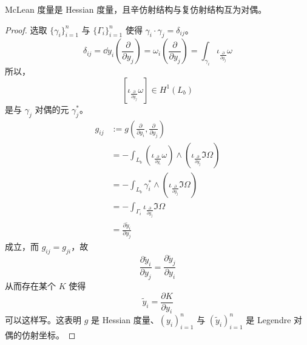 \begin{theorem}
McLean 度量是 Hessian 度量，且辛仿射结构与复仿射结构互为对偶。
\end{theorem}

\begin{proof}
选取 $\{\gamma_i\}_{i=1}^{n}$ 与 $\{\Gamma_i\}_{i=1}^{n}$ 使得 $\gamma_i\cdot\gamma_j = \delta_{ij}$。
\begin{equation}
  \delta_{ij} = \dd y_i\left(\frac{\partial}{\partial y_j}\right)
  = \omega_i\left(\frac{\partial}{\partial y_j}\right)
  = \int_{\gamma_i}\iota_{\frac{\partial}{\partial y_j}}\omega \tag{27.1}
\end{equation}
所以，
\begin{equation}
  \left[\iota_{\frac{\partial}{\partial y_j}}\omega\right] \in H^1(L_b) \tag{27.2}
\end{equation}
是与 $\gamma_j$ 对偶的元 $\gamma_j^*$。
\begin{align}
  g_{ij} &:= g\left(\frac{\partial}{\partial y_i}, \frac{\partial}{\partial y_j}\right) \tag{27.3}\\
  &= -\int_{L_b}\left(\iota_{\frac{\partial}{\partial y_i}}\omega\right)
    \wedge\left(\iota_{\frac{\partial}{\partial y_j}}\Im\Omega\right) \tag{27.4}\\
  &= -\int_{L_b}\gamma_i^*\wedge\left(\iota_{\frac{\partial}{\partial y_j}}\Im\Omega\right) \tag{27.5}\\
  &= -\int_{\Gamma_i}\iota_{\frac{\partial}{\partial y_j}}\Im\Omega \tag{27.6}\\
  &= \frac{\partial \tilde y_i}{\partial y_j} \tag{27.7}
\end{align}
成立，而 $g_{ij} = g_{ji}$，故
\begin{equation}
  \frac{\partial \tilde y_i}{\partial y_j} = \frac{\partial \tilde y_j}{\partial y_i} \tag{27.8}
\end{equation}
从而存在某个 $K$ 使得
\begin{equation}
  \tilde y_i = \frac{\partial K}{\partial y_i} \tag{27.9}
\end{equation}
可以这样写。这表明 $g$ 是 Hessian 度量、$(y_i)_{i=1}^{n}$ 与 $(\tilde y_i)_{i=1}^{n}$ 是 Legendre 对偶的仿射坐标。
\end{proof}


